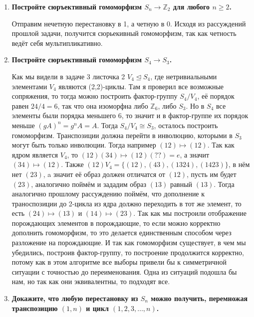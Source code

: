 \documentclass{article}
\begin{document}
\begin{enumerate}
    \item \textbf{Постройте сюръективный гомоморфизм $S_n\longrightarrow
        \mathbb{Z}_2$ для любого $n\geq 2$.}

        Отправим нечетную перестановку в 1, а четную в 0. Исходя из рассуждений
        прошлой задачи, получится сюрьекивный гомоморфизм, так как четность ведёт
        себя мультипликативно.

    \item \textbf{Постройте сюръективный гомоморфизм $S_4\longrightarrow S_3$.}
        
        Как мы видели в задаче 3 листочка 2 $V_4\trianglelefteq S_4$, где
        нетривиальными элементами $V_4$ являются (2,2)-циклы. Там я проверил
        все возможные сопряжения, то тогда можно построить фактор-группу
        $S_4/V_4$, её порядок равен $24/4=6$, так что она изоморфна либо
        $\mathbb{Z}_6$, либо $S_3$. Но в $S_4$ все элементы были порядка
        меньшего 6, то значит и в фактор-группе их порядок меньше $(gA)^n=g^nA=
        A$. Тогда $S_4/V_4\cong S_3$, осталось построить гомоморфизм.
        Транспозиции должна перейти в инволюцию, которыми в $S_3$ могут быть
        только инволюции. Тогда например $(12)\mapsto(12)$. Так как ядром
        является $V_4$, то $(12)(34)\mapsto(12)(??)=e$, а значит $(34)\mapsto
        (12)$. Также $(12)V_4=\{(12),(43),(1324),(1423)\}$, в нём нет $(23)$,
        a значит её образ должен отличатся от $(12)$, пусть им будет $(23)$,
        аналогично поймём и зададим образ $(13)$ равный $(13)$. Тогда аналогично
        прошлому рассуждению поймём, что дополнение к траноспозиции до 2-цикла
        из ядра должно переходить в тот же элемент, то есть $(24)\mapsto(13)$ и
        $(14)\mapsto(23)$. Так как мы построили отображение порождающих элементов
        в порождающие, то если можно корректно дополнить гомоморфизм, то это
        делается единственным способом через разложение на порождающие. И так
        как гомоморфизм существует, в чем мы убедились, построив фактор-группу,
        то построение продолжится корректно, потому как в этом алгоритме все
        выборы привели бы к симметричной ситуации с точностью до переименования.
        Одна из ситуаций подошла бы нам, но так как они эквивалентны, то подходят
        все.

    \item \textbf{Докажите, что любую перестановку из $S_n$ можно получить,
        перемножая транспозицию $(1,n)$ и цикл $(1,2,3,\dots,n)$.}


\end{enumerate}
\end{document}
